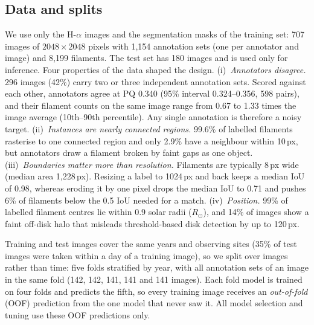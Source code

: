 \documentclass[sigconf]{acmart}
\begin{document}
\subsection{Data and splits}
We use only the H-$\alpha$ images and the segmentation masks of the training set: 707 images of $2048\times2048$ pixels with 1{,}154 annotation sets (one per annotator and image) and 8{,}199 filaments. The test set has 180 images and is used only for inference. Four properties of the data shaped the design.
(i)~\emph{Annotators disagree.} 296 images (42\%) carry two or three independent annotation sets. Scored against each other, annotators agree at PQ 0.340 (95\% interval 0.324--0.356, 598 pairs), and their filament counts on the same image range from 0.67 to 1.33 times the image average (10th--90th percentile). Any single annotation is therefore a noisy target.
(ii)~\emph{Instances are nearly connected regions.} 99.6\% of labelled filaments rasterise to one connected region and only 2.9\% have a neighbour within 10\,px, but annotators draw a filament broken by faint gaps as one object.
(iii)~\emph{Boundaries matter more than resolution.} Filaments are typically 8\,px wide (median area 1{,}228\,px). Resizing a label to 1024\,px and back keeps a median IoU of 0.98, whereas eroding it by one pixel drops the median IoU to 0.71 and pushes 6\% of filaments below the 0.5 IoU needed for a match.
(iv)~\emph{Position.} 99\% of labelled filament centres lie within 0.9 solar radii ($R_\odot$), and 14\% of images show a faint off-disk halo that misleads threshold-based disk detection by up to 120\,px.

Training and test images cover the same years and observing sites (35\% of test images were taken within a day of a training image), so we split over images rather than time: five folds stratified by year, with all annotation sets of an image in the same fold (142, 142, 141, 141 and 141 images). Each fold model is trained on four folds and predicts the fifth, so every training image receives an \emph{out-of-fold} (OOF) prediction from the one model that never saw it. All model selection and tuning use these OOF predictions only.
\end{document}
